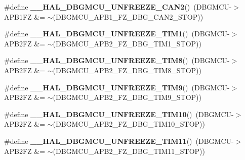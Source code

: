 \begin{DoxyCompactItemize}
\#define {\bfseries \+\_\+\+\_\+\+H\+A\+L\+\_\+\+D\+B\+G\+M\+C\+U\+\_\+\+U\+N\+F\+R\+E\+E\+Z\+E\+\_\+\+C\+A\+N2}()~(D\+B\+G\+M\+CU-\/$>$A\+P\+B1\+FZ \&= $\sim$(D\+B\+G\+M\+C\+U\+\_\+\+A\+P\+B1\+\_\+\+F\+Z\+\_\+\+D\+B\+G\+\_\+\+C\+A\+N2\+\_\+\+S\+T\+OP))
\item 
\mbox{\label{group___h_a_l___exported___macros_ga2f91eec9f9a424ab611be0e770c6692e}} 
\#define {\bfseries \+\_\+\+\_\+\+H\+A\+L\+\_\+\+D\+B\+G\+M\+C\+U\+\_\+\+U\+N\+F\+R\+E\+E\+Z\+E\+\_\+\+T\+I\+M1}()~(D\+B\+G\+M\+CU-\/$>$A\+P\+B2\+FZ \&= $\sim$(D\+B\+G\+M\+C\+U\+\_\+\+A\+P\+B2\+\_\+\+F\+Z\+\_\+\+D\+B\+G\+\_\+\+T\+I\+M1\+\_\+\+S\+T\+OP))
\item 
\mbox{\label{group___h_a_l___exported___macros_ga7375cef18047e43c68f6bd871de40f1a}} 
\#define {\bfseries \+\_\+\+\_\+\+H\+A\+L\+\_\+\+D\+B\+G\+M\+C\+U\+\_\+\+U\+N\+F\+R\+E\+E\+Z\+E\+\_\+\+T\+I\+M8}()~(D\+B\+G\+M\+CU-\/$>$A\+P\+B2\+FZ \&= $\sim$(D\+B\+G\+M\+C\+U\+\_\+\+A\+P\+B2\+\_\+\+F\+Z\+\_\+\+D\+B\+G\+\_\+\+T\+I\+M8\+\_\+\+S\+T\+OP))
\item 
\mbox{\label{group___h_a_l___exported___macros_ga3c336afea7d87b769cee4fb059ed2477}} 
\#define {\bfseries \+\_\+\+\_\+\+H\+A\+L\+\_\+\+D\+B\+G\+M\+C\+U\+\_\+\+U\+N\+F\+R\+E\+E\+Z\+E\+\_\+\+T\+I\+M9}()~(D\+B\+G\+M\+CU-\/$>$A\+P\+B2\+FZ \&= $\sim$(D\+B\+G\+M\+C\+U\+\_\+\+A\+P\+B2\+\_\+\+F\+Z\+\_\+\+D\+B\+G\+\_\+\+T\+I\+M9\+\_\+\+S\+T\+OP))
\item 
\mbox{\label{group___h_a_l___exported___macros_gaa63c03a742fa4728b49077514189b318}} 
\#define {\bfseries \+\_\+\+\_\+\+H\+A\+L\+\_\+\+D\+B\+G\+M\+C\+U\+\_\+\+U\+N\+F\+R\+E\+E\+Z\+E\+\_\+\+T\+I\+M10}()~(D\+B\+G\+M\+CU-\/$>$A\+P\+B2\+FZ \&= $\sim$(D\+B\+G\+M\+C\+U\+\_\+\+A\+P\+B2\+\_\+\+F\+Z\+\_\+\+D\+B\+G\+\_\+\+T\+I\+M10\+\_\+\+S\+T\+OP))
\item 
\mbox{\label{group___h_a_l___exported___macros_gae6396470b3bddff9424201bf07573f19}} 
\#define {\bfseries \+\_\+\+\_\+\+H\+A\+L\+\_\+\+D\+B\+G\+M\+C\+U\+\_\+\+U\+N\+F\+R\+E\+E\+Z\+E\+\_\+\+T\+I\+M11}()~(D\+B\+G\+M\+CU-\/$>$A\+P\+B2\+FZ \&= $\sim$(D\+B\+G\+M\+C\+U\+\_\+\+A\+P\+B2\+\_\+\+F\+Z\+\_\+\+D\+B\+G\+\_\+\+T\+I\+M11\+\_\+\+S\+T\+OP))
\item 

\end{DoxyCompactItemize}
